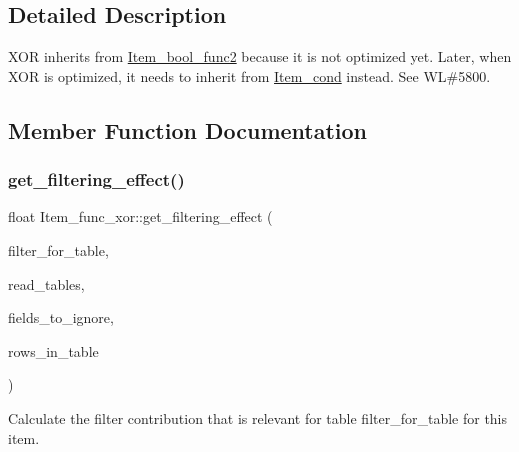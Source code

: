 \subsection{Detailed Description}
X\+OR inherits from \mbox{\hyperlink{classItem__bool__func2}{Item\+\_\+bool\+\_\+func2}} because it is not optimized yet. Later, when X\+OR is optimized, it needs to inherit from \mbox{\hyperlink{classItem__cond}{Item\+\_\+cond}} instead. See WL\#5800. 

\subsection{Member Function Documentation}
\mbox{\label{classItem__func__xor_abd4e66123ec93ceb67d18b756c1c2720}} 
\subsubsection{\texorpdfstring{get\+\_\+filtering\+\_\+effect()}{get\_filtering\_effect()}}
{\footnotesize\ttfamily float Item\+\_\+func\+\_\+xor\+::get\+\_\+filtering\+\_\+effect (\begin{DoxyParamCaption}\item[{table\+\_\+map}]{filter\+\_\+for\+\_\+table,  }\item[{table\+\_\+map}]{read\+\_\+tables,  }\item[{const M\+Y\+\_\+\+B\+I\+T\+M\+AP $\ast$}]{fields\+\_\+to\+\_\+ignore,  }\item[{double}]{rows\+\_\+in\+\_\+table }\end{DoxyParamCaption})\hspace{0.3cm}{\ttfamily [virtual]}}

Calculate the filter contribution that is relevant for table \textquotesingle{}filter\+\_\+for\+\_\+table\textquotesingle{} for this item.


